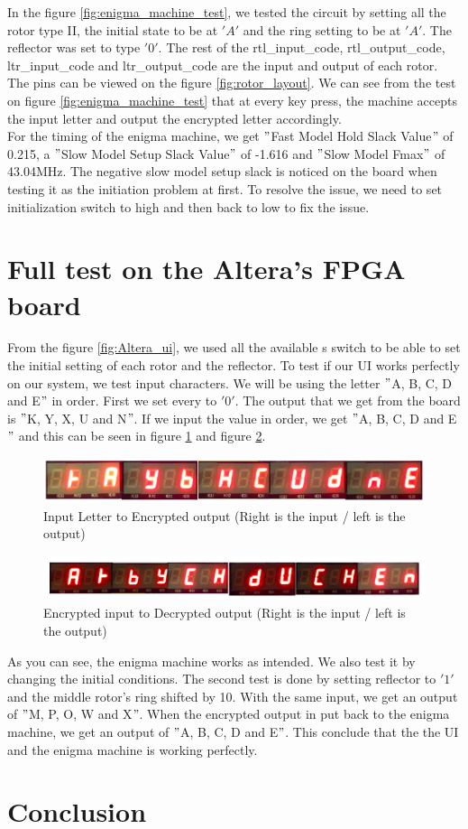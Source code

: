 \documentclass[10pt]{article}
\begin{document}
In the figure \ref{fig:enigma_machine_test}, we tested the circuit by setting all the rotor type II, the initial state to be at $'A'$ and the ring setting to be at $'A'$. The reflector was set to type $'0'$. The rest of the rtl\_input\_code, rtl\_output\_code, ltr\_input\_code and ltr\_output\_code are the input and output of each rotor. The pins can be viewed on the figure \ref{fig:rotor_layout}. We can see from the test on figure \ref{fig:enigma_machine_test} that at every key press, the machine accepts the input letter and output the encrypted letter accordingly.\\
For the timing of the enigma machine, we get $"$Fast Model Hold Slack Value$"$ of 0.215, a $"$Slow Model Setup Slack Value$"$ of -1.616 and $"$Slow Model Fmax$"$ of 43.04MHz. The negative slow model setup slack is noticed on the board when testing it as the initiation problem at first. To resolve the issue, we need to set initialization switch to high and then back to low to fix the issue.

\section{Full test on the Altera's FPGA board}
From the figure \ref{fig:Altera_ui}, we used all the available s switch to be able to set the initial setting of each rotor and the reflector. To test if our UI works perfectly on our system, we test input characters. We will be using the letter $"$A, B, C, D and E$"$ in order. First we set every to $'0'$. The output that we get from the board is $"$K, Y, X, U and N$"$. If we input the value in order, we get $"$A, B, C, D and E$"$ and this can be seen in figure \ref{fig:letter_encrypt} and figure \ref{fig:encrypt_letter}.
\begin{figure}[!htb]
    \centering
    \includegraphics[width=1\textwidth]{./letter_encrypt.png}
    \caption{Input Letter to Encrypted output (Right is the input / left is the output)}
    \label{fig:letter_encrypt}
\end{figure}
\begin{figure}[!htb]
    \centering
    \includegraphics[width=1\textwidth]{./encrypt_letter.png}
    \caption{Encrypted input to Decrypted output (Right is the input / left is the output)}
    \label{fig:encrypt_letter}
\end{figure}
As you can see, the enigma machine works as intended. We also test it by changing the initial conditions. The second test is done by setting reflector to $'1'$ and the middle rotor's ring shifted by 10. With the same input, we get an output of $"$M, P, O, W and X$"$. When the encrypted output in put back to the enigma machine, we get an output of $"$A, B, C, D and E$"$. This conclude that the the UI and the enigma machine is working perfectly.

\section{Conclusion}
\end{document}
